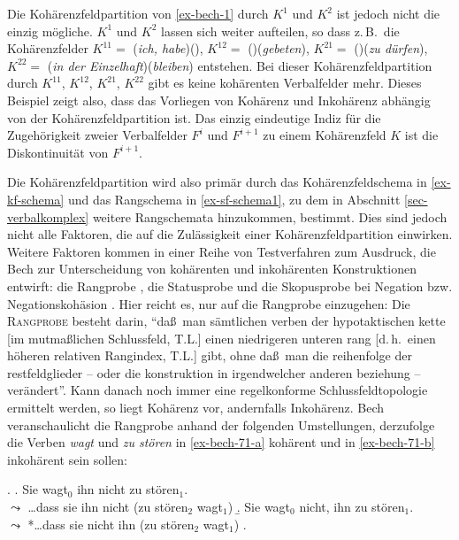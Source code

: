 Die Kohärenzfeldpartition von \ref{ex-bech-1} durch $K^1$ und $K^2$ ist jedoch nicht die einzig mögliche. $K^1$ und $K^2$ lassen sich weiter aufteilen, so dass z.\,B.\ die Kohärenzfelder $K^{11} =$ ({\it ich, habe})(), $K^{12} =$ ()({\it gebeten}), $K^{21} =$ ()({\it zu dürfen}), $K^{22} =$ ({\it in der Einzelhaft})({\it bleiben}) entstehen. Bei dieser Kohärenzfeldpartition durch $K^{11}$, $K^{12}$, $K^{21}$, $K^{22}$ gibt es keine kohärenten Verbalfelder mehr. Dieses Beispiel zeigt also, dass das Vorliegen von Kohärenz und Inkohärenz abhängig von der Kohärenzfeldpartition ist. Das einzig eindeutige Indiz für die Zugehörigkeit zweier Verbalfelder  $F^i$ und $F^{i+1}$ zu einem Kohärenzfeld $K$ ist die Diskontinuität von  $F^{i+1}$.

Die Kohärenzfeldpartition wird also primär durch das Kohärenzfeldschema in \ref{ex-kf-schema} und das Rangschema in \ref{ex-sf-schema1}, zu dem in Abschnitt \ref{sec-verbalkomplex} weitere Rangschemata hinzukommen, bestimmt. Dies sind jedoch nicht alle Faktoren, die auf die Zulässigkeit einer Kohärenzfeldpartition einwirken. Weitere Faktoren kommen in einer Reihe von Testverfahren zum Ausdruck, die Bech zur Unterscheidung von kohärenten und inkohärenten Konstruktionen entwirft: die Rangprobe \citep[\S 71]{Bech:55}, die Statusprobe \citep[\S 73]{Bech:55} und die Skopusprobe bei Negation bzw. Negationskohäsion \citep[\S 80]{Bech:55}. Hier reicht es, nur auf die Rangprobe einzugehen: Die \textsc{Rangprobe} besteht darin, "`da\ss\ man sämtlichen verben der hypotaktischen kette [im mutma\ss lichen Schlussfeld, T.L.] einen niedrigeren unteren rang [d.\,h.\ einen höheren relativen Rangindex, T.L.] gibt, ohne da\ss\ man die reihenfolge der restfeldglieder -- oder die konstruktion in irgendwelcher anderen beziehung -- verändert"'. Kann danach noch immer eine regelkonforme Schlussfeldtopologie ermittelt werden, so liegt Kohärenz vor, andernfalls Inkohärenz. Bech veranschaulicht die Rangprobe anhand der folgenden Umstellungen, derzufolge die Verben {\it wagt} und {\it zu stören} in \ref{ex-bech-71-a} kohärent und in \ref{ex-bech-71-b} inkohärent sein sollen:

\ex. \label{ex-bech-71}
\a. \label{ex-bech-71-a}Sie wagt$_0$ ihn nicht zu stören$_1$. \\
$\leadsto$ \ldots dass sie ihn nicht (zu stören$_2$ wagt$_1$)
\b. \label{ex-bech-71-b}Sie wagt$_0$ nicht, ihn zu stören$_1$. \\
$\leadsto$ *\ldots dass sie nicht ihn (zu stören$_2$ wagt$_1$)
\z. \citep[\S 71]{Bech:55}


